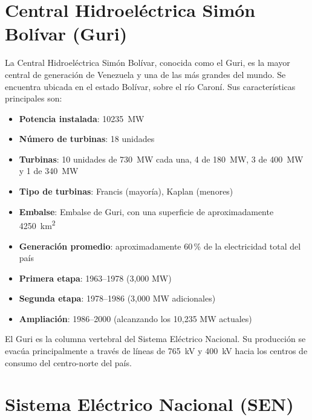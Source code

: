 \documentclass[12pt,a4paper]{article}
\begin{document}
\section{Central Hidroeléctrica Simón Bolívar (Guri)}

La Central Hidroeléctrica Simón Bolívar, conocida como el Guri, es la
mayor central de generación de Venezuela y una de las más grandes del
mundo. Se encuentra ubicada en el estado Bolívar, sobre el río Caroní.
Sus características principales son:

\begin{itemize}[nosep]
    \item \textbf{Potencia instalada}: \SI{10235}{\mega\watt}
    \item \textbf{Número de turbinas}: 18 unidades
    \item \textbf{Turbinas}: 10 unidades de \SI{730}{\mega\watt} cada una,
          4 de \SI{180}{\mega\watt}, 3 de \SI{400}{\mega\watt} y 1 de
          \SI{340}{\mega\watt}
    \item \textbf{Tipo de turbinas}: Francis (mayoría), Kaplan (menores)
    \item \textbf{Embalse}: Embalse de Guri, con una superficie de
          aproximadamente \SI{4250}{\square\km}
    \item \textbf{Generación promedio}: aproximadamente 60\,\% de la
          electricidad total del país
    \item \textbf{Primera etapa}: 1963--1978 (3,000 MW)
    \item \textbf{Segunda etapa}: 1978--1986 (3,000 MW adicionales)
    \item \textbf{Ampliación}: 1986--2000 (alcanzando los 10,235 MW
          actuales)
\end{itemize}

El Guri es la columna vertebral del Sistema Eléctrico Nacional. Su
producción se evacúa principalmente a través de líneas de
\SI{765}{\kilo\volt} y \SI{400}{\kilo\volt} hacia los centros de consumo
del centro-norte del país.

\section{Sistema Eléctrico Nacional (SEN)}
\end{document}
